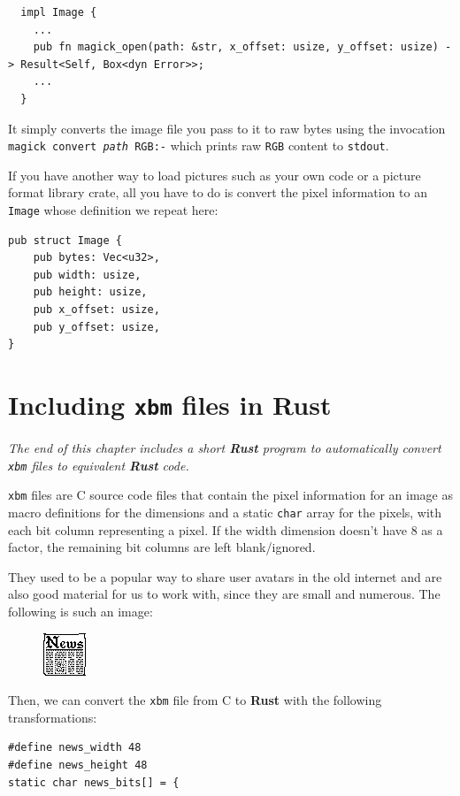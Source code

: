 \documentclass[12pt,openany,a4,usenames,dvipsnames]{book}
\newcommand\pixel{{\pixelfont{}pixel}}
\newcommand\pixels{{\pixelfont{}pixels}}
\newcommand\Rust{{\fira{}\textbf{Rust}}}
\begin{document}
\begin{verbatim}
  impl Image {
    ...
    pub fn magick_open(path: &str, x_offset: usize, y_offset: usize) -> Result<Self, Box<dyn Error>>;
    ...
  }
\end{verbatim}

It simply converts the image file you pass to it to raw bytes using the invocation \texttt{magick convert \emph{path} RGB:-} which prints raw \texttt{RGB} content to \texttt{stdout}.

If you have another way to load pictures such as your own code or a picture format library crate, all you have to do is convert the pixel information to an \texttt{Image} whose definition we repeat here:

\begin{verbatim}
pub struct Image {
    pub bytes: Vec<u32>,
    pub width: usize,
    pub height: usize,
    pub x_offset: usize,
    pub y_offset: usize,
}
\end{verbatim}
\chapter{Including \texttt{xbm} files in \Rust{}}\label{ch:xbmtors}

\emph{The end of this chapter includes a short \Rust{} program to automatically convert \texttt{xbm} files to equivalent \Rust{} code.}

\texttt{xbm} files are C source code files that contain the \pixel{} information for an image as macro definitions for the dimensions and a static \texttt{char} array for the \pixels{}, with each bit column representing a pixel. If the width dimension doesn't have 8 as a factor, the remaining bit columns are left blank/ignored.

They used to be a popular way to share user avatars in the old internet and are also good material for us to work with, since they are small and numerous. The following is such an image:

\begin{figure}[H]
\centering
\includegraphics{figures/news.png}
\end{figure}
Then, we can convert the \texttt{xbm} file from C to \Rust{} with the following transformations:

\begin{verbatim}
#define news_width 48
#define news_height 48
static char news_bits[] = {
\end{verbatim}
\end{document}
